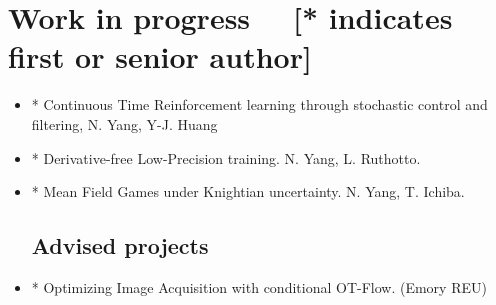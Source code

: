 \documentclass[11pt,a4paper,roman]{moderncv}
\begin{document}
\section{Work in progress \small{\ \ [* indicates first or senior author]}}
\begin{itemize}
\item * Continuous Time Reinforcement learning through stochastic control and filtering, N. Yang, Y-J. Huang
\item * Derivative-free Low-Precision training. N. Yang, L. Ruthotto. 
\vspace{2pt}
\item * Mean Field Games under Knightian uncertainty. N. Yang, T. Ichiba. 
\vspace{2pt}
\subsection{Advised projects}
\item * Optimizing Image Acquisition with conditional OT-Flow. (Emory REU)
\end{itemize}



\end{document}
